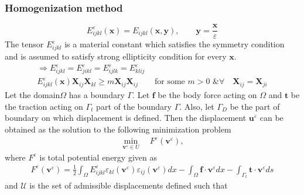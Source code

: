 \documentclass[10pt]{article}
\begin{document}
\subsubsection{Homogenization method}
\begin{equation}
E_{ijkl}^\varepsilon (\textbf{x}) = E_{ijkl}(\textbf{x},\textbf{y}), \qquad \textbf{y} = \frac{\textbf{x}}{\varepsilon}
\end{equation}
The tensor $E_{ijkl}^\varepsilon$ is a material constant which satisfies the symmetry condition and is assumed to satisfy strong ellipticity condition for every $\textbf{x}$.
\begin{gather}
\Rightarrow E_{ijkl}^\varepsilon =E_{jikl}^\varepsilon =E_{ijlk}^\varepsilon =E_{klij}^\varepsilon\\
E_{ijkl}^\varepsilon(\textbf{x})\textbf{X}_{ij}\textbf{X}_{kl}\geq m\textbf{X}_{ij}\textbf{X}_{ij} \qquad \text{for some } m>0 \text{ \& } \forall \quad \textbf{X}_{ij}=\textbf{X}_{ji}
\end{gather}
Let the domain$\Omega$ has a boundary $\Gamma$. Let $\textbf{f}$ be the body force acting on $\Omega$ and $\textbf{t}$ be the traction acting on $\Gamma_t$ part of the boundary $\Gamma$. Also, let $\Gamma_D$ be the part of boundary on which displacement is defined. Then the displacement $\textbf{u}^\varepsilon$ can be obtained as the solution to the following minimization problem
\begin{align}
\label{fem}
\min_{\textbf{v}^\varepsilon\in U} \quad F^\varepsilon(\textbf{v}^\varepsilon),
\end{align} 
where $F^\varepsilon$ is total potential energy given as	
\begin{eqnarray} \label{tpe}
F^\varepsilon(\textbf{v}^\varepsilon) = \frac{1}{2}\int_\Omega E^\varepsilon_{ijkl}\varepsilon_{kl}(\textbf{v}^\varepsilon)\varepsilon_{ij}(\textbf{v}^\varepsilon)dx-\int_\Omega\textbf{f}\cdot\textbf{v}^\varepsilon dx - \int_{\Gamma_t}\textbf{t}\cdot\textbf{v}^\varepsilon ds
\end{eqnarray}
and $\mathcal{U}$ is the set of admissible displacements defined such that
\end{document}
